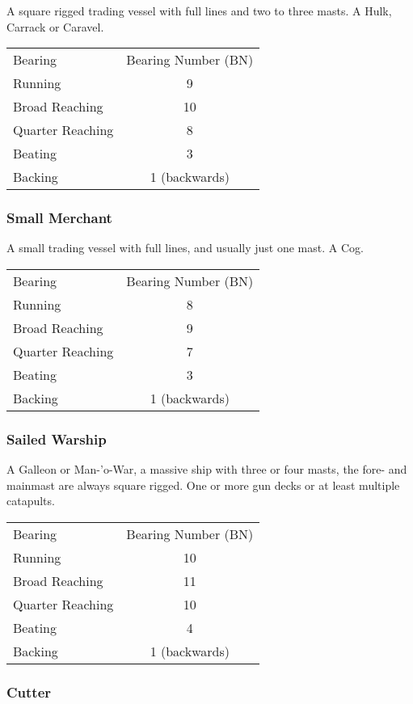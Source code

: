 \documentclass[11pt]{wbzine}
\begin{document}
\begin{multicols}{2}
A square rigged trading vessel with full lines and two to three masts. A
Hulk, Carrack or Caravel.

\begin{tabularx}{\columnwidth}{Zc}
Bearing & Bearing Number (BN) \\
Running & 9 \\
Broad Reaching & 10 \\
Quarter Reaching & 8 \\
Beating & 3 \\
Backing & 1 (backwards) \\
\end{tabularx}

\subsubsection{Small Merchant}

A small trading vessel with full lines, and usually just one mast. A
Cog.

\begin{tabularx}{\columnwidth}{Zc}
Bearing & Bearing Number (BN) \\
Running & 8 \\
Broad Reaching & 9 \\
Quarter Reaching & 7 \\
Beating & 3 \\
Backing & 1 (backwards) \\
\end{tabularx}

\subsubsection{Sailed Warship}

A Galleon or Man-'o-War, a massive ship with three or four masts, the
fore- and mainmast are always square rigged. One or more gun decks or at
least multiple catapults.

\begin{tabularx}{\columnwidth}{Zc}
Bearing & Bearing Number (BN) \\
Running & 10 \\
Broad Reaching & 11 \\
Quarter Reaching & 10 \\
Beating & 4 \\
Backing & 1 (backwards) \\
\end{tabularx}

\subsubsection{Cutter}


\end{multicols}
\end{document}
